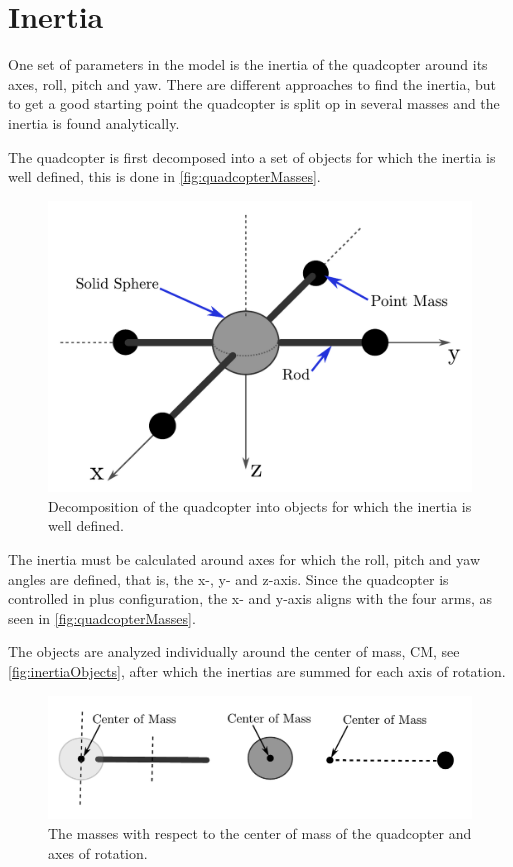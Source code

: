 \chapter{Inertia}\label{app:Inertia}
One set of parameters in the model is the inertia of the quadcopter around its axes, roll, pitch and yaw. There are different approaches to find the inertia, but to get a good starting point the quadcopter is split op in several masses and the inertia is found analytically.

The quadcopter is first decomposed into a set of objects for which the inertia is well defined, this is done in \autoref{fig:quadcopterMasses}.

\begin{figure}[H]
  \centering
  \includegraphics[width=.6\linewidth]{figures/quadcopterMasses}
  \caption{Decomposition of the quadcopter into objects for which the inertia is well defined.}
  \label{fig:quadcopterMasses}
\end{figure}

The inertia must be calculated around axes for which the roll, pitch and yaw angles are defined, that is, the x-, y- and z-axis. Since the quadcopter is controlled in plus configuration, the x- and y-axis aligns with the four arms, as seen in \autoref{fig:quadcopterMasses}.

The objects are analyzed individually around the center of mass, CM, see \autoref{fig:inertiaObjects}, after which the inertias are summed for each axis of rotation.

\begin{figure}[H]
  \centering
  \includegraphics[width=.9\linewidth]{figures/inertiaObjects}
  \caption{The masses with respect to the center of mass of the quadcopter and axes of rotation.}
  \label{fig:inertiaObjects}
\end{figure}

